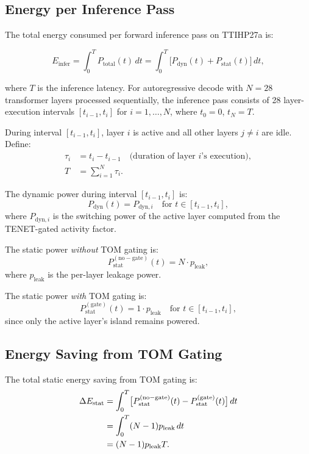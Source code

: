 \subsection{Energy per Inference Pass}

The total energy consumed per forward inference pass on TTIHP27a is:

\begin{equation}
  E_{\mathrm{infer}} = \int_{0}^{T} P_{\mathrm{total}}(t)\, dt
  = \int_{0}^{T} \bigl[P_{\mathrm{dyn}}(t) + P_{\mathrm{stat}}(t)\bigr]\, dt,
  \label{eq:energy_integral}
\end{equation}

where \(T\) is the inference latency.  For autoregressive decode with
\(N = 28\) transformer layers processed sequentially, the inference pass
consists of 28 layer-execution intervals \([t_{i-1}, t_{i}]\) for
\(i = 1, \ldots, N\), where \(t_{0} = 0\), \(t_{N} = T\).

During interval \([t_{i-1}, t_i]\), layer \(i\) is active and all other
layers \(j \neq i\) are idle.  Define:
\begin{align*}
  \tau_i &= t_i - t_{i-1} \quad \text{(duration of layer } i\text{'s execution)}, \\
  T &= \sum_{i=1}^{N} \tau_i.
\end{align*}

The dynamic power during interval \([t_{i-1}, t_i]\) is:
\[
  P_{\mathrm{dyn}}(t) = P_{\mathrm{dyn},i}
  \quad\text{for } t \in [t_{i-1}, t_i],
\]
where \(P_{\mathrm{dyn},i}\) is the switching power of the active layer
computed from the TENET-gated activity factor.

The static power \emph{without} TOM gating is:
\[
  P_{\mathrm{stat}}^{(\mathrm{no-gate})}(t) = N \cdot p_{\mathrm{leak}},
\]
where \(p_{\mathrm{leak}}\) is the per-layer leakage power.

The static power \emph{with} TOM gating is:
\[
  P_{\mathrm{stat}}^{(\mathrm{gate})}(t) = 1 \cdot p_{\mathrm{leak}}
  \quad\text{for } t \in [t_{i-1}, t_i],
\]
since only the active layer's island remains powered.

\subsection{Energy Saving from TOM Gating}

The total static energy saving from TOM gating is:
\begin{align}
  \Delta E_{\mathrm{stat}} &= \int_{0}^{T}
  \bigl[P_{\mathrm{stat}}^{(\mathrm{no-gate})}(t)
  - P_{\mathrm{stat}}^{(\mathrm{gate})}(t)\bigr]\, dt
  \notag \\
  &= \int_{0}^{T} (N - 1) p_{\mathrm{leak}}\, dt
  \notag \\
  &= (N-1) p_{\mathrm{leak}} T.
  \label{eq:delta_e_stat}
\end{align}

